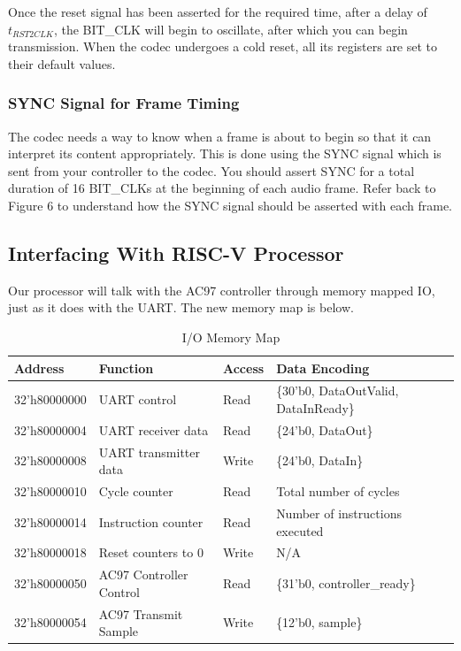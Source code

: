 \documentclass[11pt]{article}
\begin{document}
Once the reset signal has been asserted for the required time, after a delay of $t_{RST2CLK}$, the BIT\_CLK will begin to oscillate, after which you can begin transmission. When the codec undergoes a cold reset, all its registers are set to their default values.

\subsubsection{SYNC Signal for Frame Timing}
The codec needs a way to know when a frame is about to begin so that it can interpret its content appropriately. This is done using the SYNC signal which is sent from your controller to the codec. You should assert SYNC for a total duration of 16 BIT\_CLKs at the beginning of each audio frame. Refer back to Figure 6 to understand how the SYNC signal should be asserted with each frame.

\subsection{Interfacing With RISC-V Processor}
Our processor will talk with the AC97 controller through memory mapped IO, just as it does with the UART. The new memory map is below.

\begin{table}[hbt]
	\begin{center}
		\caption{I/O Memory Map}
		\label{mem_map2}
		\begin{tabular}{l l l l}
			\toprule
			\textbf{Address} & \textbf{Function} & \textbf{Access} & \textbf{Data Encoding}\\
			\midrule
			32'h80000000 & UART control & Read & \{30'b0, DataOutValid, DataInReady\} \\
			32'h80000004 & UART receiver data & Read & \{24'b0, DataOut\} \\
			32'h80000008 & UART transmitter data & Write & \{24'b0, DataIn\} \\
			\midrule
			32'h80000010 & Cycle counter & Read & Total number of cycles \\
			32'h80000014 & Instruction counter & Read & Number of instructions executed \\
			32'h80000018 & Reset  counters to 0 & Write & N/A \\
			\midrule
			32'h80000050 & AC97 Controller Control & Read & \{31'b0, controller\_ready\} \\
			32'h80000054 & AC97 Transmit Sample & Write & \{12'b0, sample\} \\ \bottomrule
		\end{tabular}
	\end{center}
\end{table}
\end{document}
